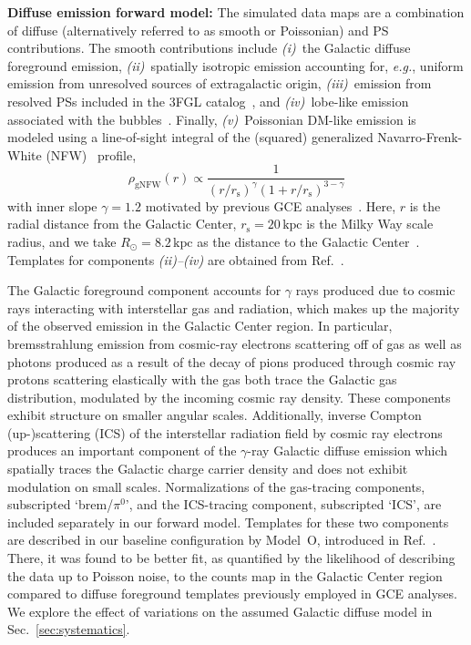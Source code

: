 \documentclass[prd,aps,10pt,nofootinbib,twocolumn,superscriptaddress,preprintnumbers,balancelastpage,longbibliography,floatfix]{revtex4-2}
\begin{document}
\noindent
\textbf{Diffuse emission forward model:} The simulated data maps are a combination of diffuse (alternatively referred to as smooth or Poissonian) and PS contributions. The smooth contributions include \emph{(i)}~the Galactic diffuse foreground emission, \emph{(ii)}~spatially isotropic emission accounting for, \emph{e.g.}, uniform emission from unresolved sources of extragalactic origin, \emph{(iii)}~emission from resolved PSs included in the \Fermi 3FGL catalog~\cite{Fermi-LAT:2015bhf}, and \emph{(iv)}~lobe-like emission associated with the \Fermi bubbles~\cite{Su:2010qj}. Finally, \emph{(v)}~Poissonian DM-like emission is modeled using a line-of-sight integral of the (squared) generalized Navarro-Frenk-White (NFW)~\cite{Navarro:1995iw,Navarro:1996gj} profile,
\begin{equation}
\label{eq:nfw}
\rho_\mathrm{gNFW}(r) \propto \frac{1}{\left(r / r_{\mathrm s}\right)^{\gamma}\left(1+r / r_{\mathrm s}\right)^{3-\gamma}}
\end{equation}
with inner slope $\gamma=1.2$ motivated by previous GCE analyses~\cite{Gordon:2013vta,Daylan:2014rsa,Zhou:2014lva}. Here, $r$ is the radial distance from the Galactic Center, $r_{\mathrm s}=20\,\mathrm{kpc}$ is the Milky Way scale radius, and we take $R_\odot = 8.2\,\mathrm{kpc}$ as the distance to the Galactic Center~\cite{2020arXiv201202169B,2019A&A...625L..10G}. Templates for components \emph{(ii)--(iv)} are obtained from Ref.~\cite{Mishra-Sharma:2016gis}. 

The Galactic foreground component accounts for $\gamma$ rays produced due to cosmic rays interacting with interstellar gas and radiation, which makes up the majority of the observed emission in the Galactic Center region. In particular, bremsstrahlung emission from cosmic-ray electrons scattering off of gas as well as photons produced as a result of the decay of pions produced through cosmic ray protons scattering elastically with the gas both trace the Galactic gas distribution, modulated by the incoming cosmic ray density. These components exhibit structure on smaller angular scales. Additionally, inverse Compton (up-)scattering (ICS) of the interstellar radiation field by cosmic ray electrons produces an important component of the $\gamma$-ray Galactic diffuse emission which spatially traces the Galactic charge carrier density and does not exhibit modulation on small scales. Normalizations of the gas-tracing components, subscripted `brem/$\pi^0$', and the ICS-tracing component, subscripted `ICS', are included separately in our forward model. Templates for these two components are described in our baseline configuration by {Model~O}, introduced in Ref.~\cite{Buschmann:2020adf}. There, it was found to be better fit, as quantified by the likelihood of describing the data up to Poisson noise, to the counts map in the Galactic Center region compared to diffuse foreground templates previously employed in GCE analyses. We explore the effect of variations on the assumed Galactic diffuse model in Sec.~\ref{sec:systematics}. 
\end{document}
